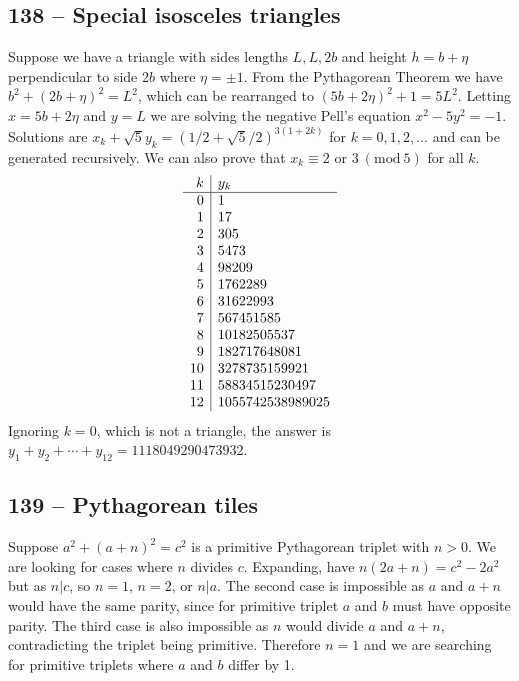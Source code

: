 \documentclass{article}
\newcommand{\Mod}[1]{\ (\mathrm{mod}\ #1)}
\begin{document}
\subsection*{138 -- Special isosceles triangles}
Suppose we have a triangle with sides lengths $L, L, 2b$ and height $h = b + \eta$ perpendicular to side $2b$ where $\eta = \pm 1$.
From the Pythagorean Theorem we have $b^2 + (2b+\eta)^2 = L^2$, which can be rearranged to $(5b+2\eta)^2+1 = 5L^2$.
Letting $x = 5b+2\eta$ and $y= L$ we are solving the negative Pell's equation $x^2 - 5y^2 = -1$.
Solutions are $x_k + \sqrt{5} y_k = (1/2 + \sqrt{5}/2)^{3(1 + 2k)}$ for $k = 0, 1, 2, \dotsc$ and can be generated recursively.
We can also prove that $x_k \equiv 2$ or $3 \Mod{5}$ for all $k$.
\begin{align*}
	\begin{array}{r | l }
	k & y_k \\ \hline
	0 & 1 \\
	1 & 17 \\
	2 & 305 \\
	3 & 5473 \\
	4 & 98209 \\
	5 & 1762289 \\
	6 & 31622993 \\
	7 & 567451585 \\
	8 & 10182505537 \\
	9 & 182717648081 \\
	10 & 3278735159921 \\
	11 & 58834515230497 \\
	12 & 1055742538989025
	\end{array}
\end{align*}
Ignoring $k=0$, which is not a triangle, the answer is $y_1 + y_2 + \cdots + y_{12} = \boxed{1118049290473932}$.


\subsection*{139 -- Pythagorean tiles}
Suppose $a^2 + (a+n)^2 = c^2$ is a primitive Pythagorean triplet with $n > 0$.
We are looking for cases where $n$ divides $c$.
Expanding, have $n(2a +n) = c^2 - 2a^2$ but as $n|c$, so $n=1$, $n=2$, or $n|a$.
The second case is impossible as $a$ and $a+n$ would have the same parity, since for primitive triplet $a$ and $b$ must have opposite parity.
The third case is also impossible as $n$ would divide $a$ and $a+n$, contradicting the triplet being primitive.
Therefore $n=1$ and we are searching for primitive triplets where $a$ and $b$ differ by 1. \\
\end{document}
